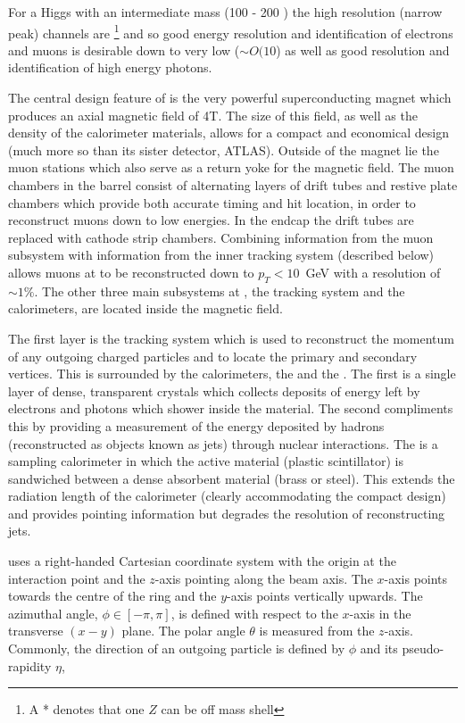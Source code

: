 For a Higgs with an intermediate mass (100 - 200 \GeV) the high resolution (narrow peak) channels are \HZZ \footnote{A * denotes that one $Z$ can be off mass shell} and \Hgg so good energy resolution and identification of electrons and muons is desirable down to very low \pT ($\sim O(10$\GeV) as well as good resolution and identification of high energy photons. 

The central design feature of \CMS is the very powerful superconducting magnet which produces an axial magnetic field of 4T. The size of this field, as well as the density of the calorimeter materials, allows for a compact and economical design (much more so than its sister detector, ATLAS). Outside of the magnet lie the muon stations which also serve as a return yoke for the magnetic field. The muon chambers in the barrel consist of alternating layers of drift tubes and restive plate chambers which provide both accurate timing and hit location, in order to reconstruct muons down to low energies. In the endcap the drift tubes are replaced with cathode strip chambers. Combining information from the muon subsystem with information from the inner tracking system (described below) allows muons at \CMS to be reconstructed down to $p_{T}<10$~GeV with a resolution of $\sim1\%$. The other three main subsystems at \CMS, the tracking system and the calorimeters, are located inside the magnetic field.

The first layer is the tracking system which is used to reconstruct the momentum of any outgoing charged particles and to locate the primary and secondary vertices. This is surrounded by the calorimeters, the \ECAL and the \HCAL. The first is a single layer of dense, transparent crystals which collects deposits of energy left by electrons and photons which shower inside the material. The second compliments this by providing a measurement of the energy deposited by hadrons (reconstructed as objects known as jets) through nuclear interactions. The \HCAL is a sampling calorimeter in which the active material (plastic scintillator) is sandwiched between a dense absorbent material (brass or steel). This extends the radiation length of the calorimeter (clearly accommodating the compact design) and provides pointing information but degrades the resolution of reconstructing jets. 

\CMS uses a right-handed Cartesian coordinate system with the origin at the interaction point and the $z$-axis pointing along the beam axis. The $x$-axis points towards the centre of the \LHC ring and the $y$-axis points vertically upwards. The azimuthal angle, $\phi \in [-\pi,\pi]$, is defined with respect to the $x$-axis in the transverse $(x-y)$ plane. The polar angle $\theta$ is measured from the $z$-axis. Commonly, the direction of an outgoing particle is defined by $\phi$ and its pseudo-rapidity $\eta$,

